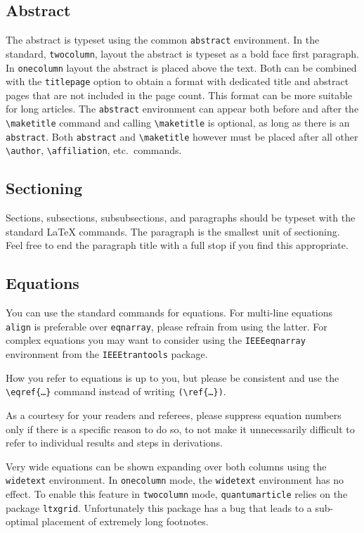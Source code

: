 \documentclass[a4paper,noarxiv,onecolumn]{quantumarticle}
\begin{document}
	\subsection{Abstract}
	The abstract is typeset using the common \texttt{abstract} environment. In the standard, \texttt{twocolumn}, layout the abstract is typeset as a bold face first paragraph.
	In \texttt{onecolumn} layout the abstract is placed above the text.
	Both can be combined with the \texttt{titlepage} option to obtain a format with dedicated title and abstract pages that are not included in the page count.
	This format can be more suitable for long articles.
	The \texttt{abstract} environment can appear both before and after the \texttt{\textbackslash{}maketitle} command and calling \texttt{\textbackslash{}maketitle} is optional, as long as there is an \texttt{abstract}.
	Both \texttt{abstract} and \texttt{\textbackslash{}maketitle} however must be placed after all other \texttt{\textbackslash{}author}, \texttt{\textbackslash{}affiliation}, etc.\ commands.
	
	\subsection{Sectioning}
	Sections, subsections, subsubsections, and paragraphs should be typeset with the standard LaTeX commands. The paragraph is the smallest unit of sectioning. Feel free to end the paragraph title with a full stop if you find this appropriate.
	
	\subsection{Equations}	
	You can use the standard commands for equations. For multi-line equations \texttt{align} is preferable over \texttt{eqnarray}, please refrain from using the latter.	For complex equations you may want to consider using the \texttt{IEEEeqnarray} environment from the \texttt{IEEEtrantools} package.
	
	How you refer to equations is up to you, but please be consistent and use the \texttt{\textbackslash{}eqref\{\dots\}} command instead of writing \texttt{(\textbackslash{}ref\{\dots\})}.
	
	As a courtesy for your readers and referees, please suppress equation numbers only if there is a specific reason to do so, to not make it unnecessarily difficult to refer to individual results and steps in derivations.
	
	Very wide equations can be shown expanding over both columns using the \texttt{widetext} environment.
	In \texttt{onecolumn} mode, the \texttt{widetext} environment has no effect.
	To enable this feature in \texttt{twocolumn} mode, \texttt{quantumarticle} relies on the package \texttt{ltxgrid}.
	Unfortunately this package has a bug that leads to a sub-optimal placement of extremely long footnotes.
	
\end{document}
